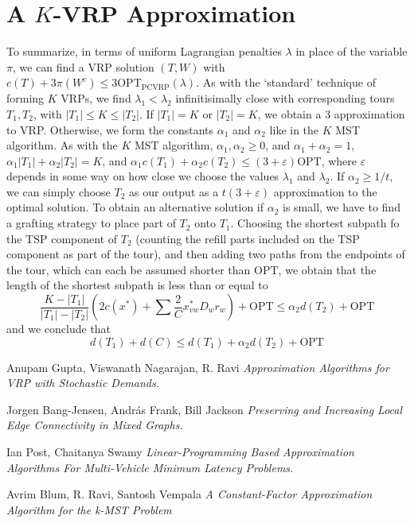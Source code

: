 \documentclass{article}
\theoremstyle{plain}
\theoremstyle{plain}
\begin{document}
\section{A $K$-VRP Approximation}

To summarize, in terms of uniform Lagrangian penalties $\lambda$ in place of the variable $\pi$, we can find a VRP solution $(T,W)$ with $c(T) + 3 \pi(W^c) \leq 3 \text{OPT}_{\text{PCVRP}}(\lambda)$. As with the `standard' technique of forming $K$ VRPs, we find $\lambda_1 < \lambda_2$ infinitisimally close with corresponding tours $T_1,T_2$, with $|T_1| \leq K \leq |T_2|$. If $|T_1| = K$ or $|T_2| = K$, we obtain a $3$ approximation to VRP. Otherwise, we form the constants $\alpha_1$ and $\alpha_2$ like in the $K$ MST algorithm. As with the $K$ MST algorithm, $\alpha_1, \alpha_2 \geq 0$, and $\alpha_1 + \alpha_2 = 1$, $\alpha_1 |T_1| + \alpha_2 |T_2| = K$, and $\alpha_1 c(T_1) + \alpha_2 c(T_2) \leq (3 + \varepsilon) \text{OPT}$, where $\varepsilon$ depends in some way on how close we choose the values $\lambda_1$ and $\lambda_2$. If $\alpha_2 \geq 1/t$, we can simply choose $T_2$ as our output as a $t(3 + \varepsilon)$ approximation to the optimal solution. To obtain an alternative solution if $\alpha_2$ is small, we have to find a grafting strategy to place part of $T_2$ onto $T_1$. Choosing the shortest subpath fo the TSP component of $T_2$ (counting the refill parts included on the TSP component as part of the tour), and then adding two paths from the endpoints of the tour, which can each be assumed shorter than $\text{OPT}$, we obtain that the length of the shortest subpath is less than or equal to
%
\[ \frac{K - |T_1|}{|T_1| - |T_2|} (2 c(x^*) + \sum \frac{2}{C} x^*_{vw} D_wr_w) + \text{OPT} \leq \alpha_2 d(T_2) + \text{OPT} \]
%
and we conclude that
%
\[ d(T_1) + d(C) \leq d(T_1) + \alpha_2 d(T_2) + \text{OPT} \]


\begin{thebibliography}{9}

Anupam Gupta, Viswanath Nagarajan, R. Ravi
\textit{Approximation Algorithms for VRP with Stochastic Demands.}

Jorgen Bang-Jensen, Andr\'{a}s Frank, Bill Jackson
\textit{Preserving and Increasing Local Edge Connectivity in Mixed Graphs.}

Ian Post, Chaitanya Swamy
\textit{Linear-Programming Based Approximation Algorithms For Multi-Vehicle Minimum Latency Problems.}

Avrim Blum, R. Ravi, Santosh Vempala
\textit{A Constant-Factor Approximation Algorithm for the k-MST Problem}

\end{thebibliography}
\end{document}
